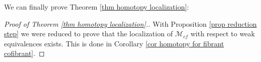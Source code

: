 \begin{refsection}

We can finally prove Theorem \ref{thm homotopy localization}:

\begin{proof}[Proof of Theorem \ref{thm homotopy localization}.]
With Proposition \ref{prop reduction step} we were reduced to prove that the localization of $\mathcal M_{cf}$ with respect to weak equivalences exists. This is done in Corollary \ref{cor homotopy for fibrant cofibrant}.
\end{proof}


\end{refsection}
